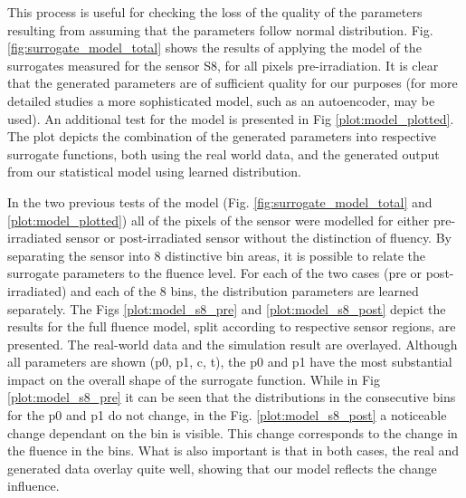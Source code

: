 This process is useful for checking the loss of the quality of the parameters resulting from assuming that the parameters follow normal distribution.
Fig. \ref{fig:surrogate_model_total} shows the results of applying the model of the surrogates measured for the sensor S8, for all pixels pre-irradiation. It is clear that the generated parameters are of sufficient quality for our purposes (for more detailed studies a more sophisticated model, such as an autoencoder, may be used).
An additional test for the model is presented in Fig \ref{plot:model_plotted}. The plot depicts the combination of the generated parameters into respective surrogate functions, both using the real world data, and the generated output from our statistical model using learned distribution.

In the two previous tests of the model (Fig. \ref{fig:surrogate_model_total} and \ref{plot:model_plotted}) all of the pixels of the sensor were modelled for either pre-irradiated sensor or post-irradiated sensor without the distinction of fluency.
By separating the sensor into 8 distinctive bin areas, it is possible to relate the surrogate parameters to the fluence level.
For each of the two cases (pre or post-irradiated) and each of the 8 bins, the distribution parameters are learned separately.
The Figs \ref{plot:model_s8_pre} and \ref{plot:model_s8_post} depict the results for the full fluence model, split according to respective sensor regions, are presented. The real-world data and the simulation result are overlayed.
Although all parameters are shown (p0, p1, c, t), the p0 and p1 have the most substantial impact on the overall shape of the surrogate function.
While in Fig \ref{plot:model_s8_pre} it can be seen that the distributions in the consecutive bins for the p0 and p1 do not change, in the Fig. \ref{plot:model_s8_post} a noticeable change dependant on the bin is visible.
This change corresponds to the change in the fluence in the bins.
What is also important is that in both cases, the real and generated data overlay quite well, showing that our model reflects the change influence.

